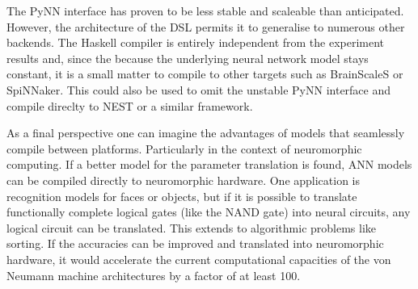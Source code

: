 \documentclass[report.tex]{subfiles}
\begin{document}
The PyNN interface has proven to be less stable and scaleable than anticipated.
However, the architecture of the \gls{DSL} permits it to generalise to numerous
other backends.
The Haskell compiler is entirely independent from the experiment
results and, since the because the underlying neural network model stays constant, 
it is a small matter to compile to other targets such as BrainScaleS or
SpiNNaker.
This could also be used to omit the unstable PyNN interface and compile direclty
to NEST or a similar framework.

As a final perspective one can imagine the advantages of models that seamlessly
compile between platforms. 
Particularly in the context of neuromorphic computing.
If a better model for the parameter translation is found, \gls{ANN} models can
be compiled directly to neuromorphic hardware.
One application is recognition models for faces or objects, but if it is
possible to translate functionally complete logical gates (like the NAND gate)
into neural circuits, any logical circuit can be translated.
This extends to algorithmic problems like sorting.
If the accuracies can be improved and translated into neuromorphic hardware, it
would accelerate the current computational capacities of the von Neumann machine
architectures by a factor of at least 100.
\\[0.1cm]

\FloatBarrier
\end{document}
